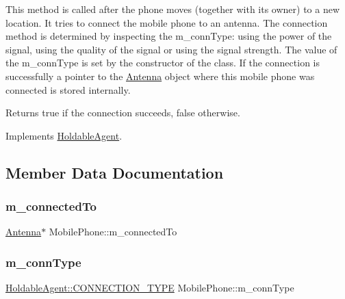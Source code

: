 This method is called after the phone moves (together with its owner) to a new location. It tries to connect the mobile phone to an antenna. The connection method is determined by inspecting the m\+\_\+conn\+Type\+: using the power of the signal, using the quality of the signal or using the signal strength. The value of the m\+\_\+conn\+Type is set by the constructor of the class. If the connection is successfully a pointer to the \mbox{\hyperlink{class_antenna}{Antenna}} object where this mobile phone was connected is stored internally. \begin{DoxyReturn}{Returns}
true if the connection succeeds, false otherwise. 
\end{DoxyReturn}


Implements \mbox{\hyperlink{class_holdable_agent_a0789d757d81b43ee016e9362046f6dea}{Holdable\+Agent}}.



\subsection{Member Data Documentation}
\mbox{\label{class_mobile_phone_aa143b94346485788c3563228f6043721}} 
\subsubsection{\texorpdfstring{m\_connectedTo}{m\_connectedTo}}
{\footnotesize\ttfamily \mbox{\hyperlink{class_antenna}{Antenna}}$\ast$ Mobile\+Phone\+::m\+\_\+connected\+To\hspace{0.3cm}{\ttfamily [private]}}

\mbox{\label{class_mobile_phone_a39f69fef45f380e3922dfe78b904372d}} 
\subsubsection{\texorpdfstring{m\_connType}{m\_connType}}
{\footnotesize\ttfamily \mbox{\hyperlink{class_holdable_agent_ae2c334b004d7b9c5a999cf2618e4e518}{Holdable\+Agent\+::\+C\+O\+N\+N\+E\+C\+T\+I\+O\+N\+\_\+\+T\+Y\+PE}} Mobile\+Phone\+::m\+\_\+conn\+Type\hspace{0.3cm}{\ttfamily [private]}}

